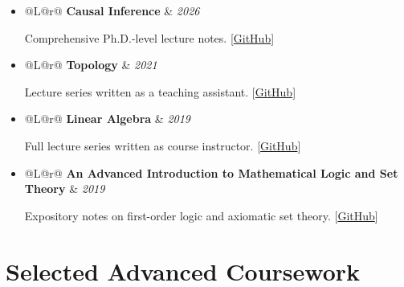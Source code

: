 \documentclass[11pt,letterpaper]{article}
\makeatletter
\newenvironment{cventries}
  {\begin{itemize}[label={},leftmargin=0pt,itemsep=0.40em,topsep=0.30em,
                   parsep=0pt,partopsep=0pt]}
  {\end{itemize}}
\newcommand{\cvline}[2]{%
  \begin{tabularx}{\linewidth}{@{}L@{\hspace{1.5em}}r@{}}
    #1 & #2
  \end{tabularx}\par}
\newcommand{\factsep}{\hspace{0.6em}}
\newcommand{\cventry}[3]{%
  \item \cvline{\textbf{#1}}{\textit{#2}}%
        \vspace{0.12em}\par{\small\sloppy #3}\par}
\makeatother
\begin{document}
\begin{cventries}

  \cventry{Causal Inference}{2026}
          {Comprehensive Ph.D.-level lecture notes.\factsep
           [\href{https://github.com/BehroozMoosavi/Lecture-Notes/tree/main/Causal_Inference}{GitHub}]}

  \cventry{Topology}{2021}
          {Lecture series written as a teaching assistant.\factsep
           [\href{https://github.com/BehroozMoosavi/Lecture-Notes/blob/main/Topology/Topology.pdf}{GitHub}]}

  \cventry{Linear Algebra}{2019}
          {Full lecture series written as course instructor.\factsep
           [\href{https://github.com/BehroozMoosavi/Lecture-Notes}{GitHub}]}

  \cventry{An Advanced Introduction to Mathematical Logic and Set Theory}
          {2019}
          {Expository notes on first-order logic and axiomatic set
           theory.\factsep
           [\href{https://github.com/BehroozMoosavi/Lecture-Notes}{GitHub}]}

\end{cventries}

\section{Selected Advanced Coursework}
\end{document}
